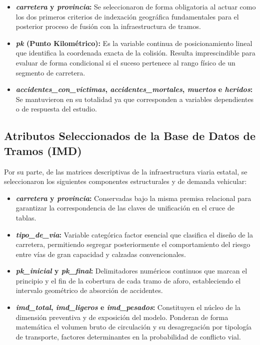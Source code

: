\documentclass[twoside,a4paper,12pt,onecolumn,openany]{book}
\begin{document}
\begin{itemize}
    \item \textbf{\textit{carretera} y \textit{provincia}:} Se seleccionaron de forma obligatoria al actuar como los dos primeros criterios de indexación geográfica fundamentales para el posterior proceso de fusión con la infraestructura de tramos.
    
    \item \textbf{\textit{pk} (Punto Kilométrico):} Es la variable continua de posicionamiento lineal que identifica la coordenada exacta de la colisión. Resulta imprescindible para evaluar de forma condicional si el suceso pertenece al rango físico de un segmento de carretera.
    
    \item \textbf{\textit{accidentes\_con\_victimas}, \textit{accidentes\_mortales}, \textit{muertos} e \textit{heridos}:}  Se mantuvieron en su totalidad ya que corresponden a variables dependientes o de respuesta del estudio. 
\end{itemize}

\subsection{Atributos Seleccionados de la Base de Datos de Tramos (IMD)}

Por su parte, de las matrices descriptivas de la infraestructura viaria estatal, se seleccionaron los siguientes componentes estructurales y de demanda vehicular:

\begin{itemize}
    \item \textbf{\textit{carretera} y \textit{provincia}:} Conservadas bajo la misma premisa relacional para garantizar la correspondencia de las claves de unificación en el cruce de tablas.
    
    \item \textbf{\textit{tipo\_de\_via}:} Variable categórica factor esencial que clasifica el diseño de la carretera, permitiendo segregar posteriormente el comportamiento del riesgo entre vías de gran capacidad y calzadas convencionales.
    
    \item \textbf{\textit{pk\_inicial} y \textit{pk\_final}:} Delimitadores numéricos continuos que marcan el principio y el fin de la cobertura de cada tramo de aforo, estableciendo el intervalo geométrico de absorción de accidentes.
    
    \item \textbf{\textit{imd\_total}, \textit{imd\_ligeros} e \textit{imd\_pesados}:} Constituyen el núcleo de la dimensión preventiva y de exposición del modelo. Ponderan de forma matemática el volumen bruto de circulación y su desagregación por tipología de transporte, factores determinantes en la probabilidad de conflicto vial.
\end{itemize}
\end{document}
